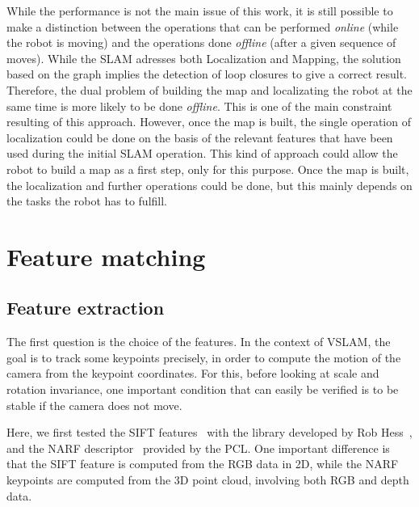 While the performance is not the main issue of this work, it is still possible to make a distinction between the operations that can be performed \emph{online} (while the robot is moving) and the operations done \emph{offline} (after a given sequence of moves). While the \gls{SLAM} adresses both Localization and Mapping, the solution based on the graph implies the detection of loop closures to give a correct result. Therefore, the dual problem of building the map and localizating the robot at the same time is more likely to be done \emph{offline}. This is one of the main constraint resulting of this approach. However, once the map is built, the single operation of localization could be done on the basis of the relevant features that have been used during the initial \gls{SLAM} operation. This kind of approach could allow the robot to build a map as a first step, only for this purpose. Once the map is built, the localization and further operations could be done, but this mainly depends on the tasks the robot has to fulfill.

\chapter{Feature matching}
\label{chap:features}

\section{Feature extraction}

The first question is the choice of the features. In the context of \gls{VSLAM}, the goal is to track some keypoints precisely, in order to compute the motion of the camera from the keypoint coordinates. For this, before looking at scale and rotation invariance, one important condition that can easily be verified is to be stable if the camera does not move. 

Here, we first tested the \gls{SIFT} features~\cite{lowe_2004_sift} with the library developed by Rob Hess~\cite{hess_sift}, and the \gls{NARF} descriptor~\cite{steder10irosws} provided by the \gls{PCL}. One important difference is that the \gls{SIFT} feature is computed from the RGB data in 2D, while the \gls{NARF} keypoints are computed from the 3D point cloud, involving both RGB and depth data.


